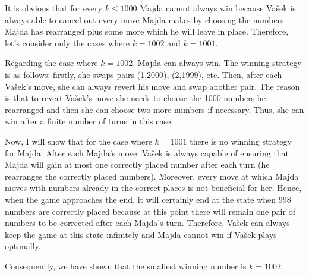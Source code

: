 \documentclass{fkssolpub}
\author{Ondřej Sedláček}
\begin{document}
It is obvious that for every $k \leq 1000$ Majda cannot always win because Vašek is always able to cancel out every move Majda makes by choosing the numbers Majda has rearranged plus some more which he will leave in place. Therefore, let's consider only the cases where $k = 1002$ and $k = 1001$.

Regarding the case where $k = 1002$, Majda can always win. The winning strategy is as follows: firstly, she swaps pairs (1,2000), (2,1999), etc. Then, after each Vašek's move, she can always revert his move and swap another pair. The reason is that to revert Vašek's move she needs to choose the 1000 numbers he rearranged and then she can choose two more numbers if necessary. Thus, she can win after a finite number of turns in this case.

Now, I will show that for the case where $k = 1001$ there is no winning strategy for Majda. After each Majda's move, Vašek is always capable of ensuring that Majda will gain at most one correctly placed number after each turn (he rearranges the correctly placed numbers). Moreover, every move at which Majda moves with numbers already in the correct places is not beneficial for her. Hence, when the game approaches the end, it will certainly end at the state when 998 numbers are correctly placed because at this point there will remain one pair of numbers to be corrected after each Majda's turn. Therefore, Vašek can always keep the game at this state infinitely and Majda cannot win if Vašek plays optimally.

Consequently, we have shown that the smallest winning number is $k = 1002$.
\end{document}
